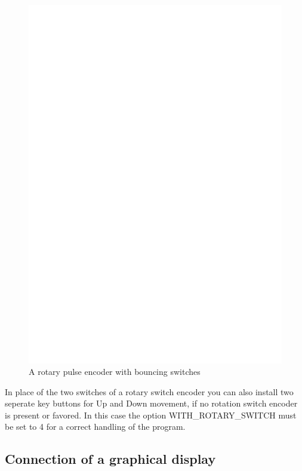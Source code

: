 \begin{figure}[H]
\centering
\includegraphics[width=14cm]{../FIG/rotary_bouncing.eps}
\caption{A rotary pulse encoder with bouncing switches}
\label{fig:RotBounce}
\end{figure}

In place of the two switches of a rotary switch encoder you can also install two seperate
key buttons for Up and Down movement, if no rotation switch encoder is present or favored.
In this case the option WITH\_ROTARY\_SWITCH must be set to 4 for a correct handling of
the program.

\subsection{Connection of a graphical display}

